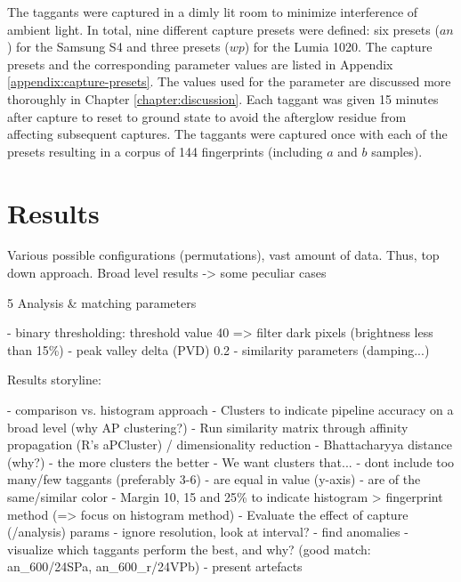 \documentclass[thesis.tex]{subfiles}
\begin{document}
The taggants were captured in a dimly lit room to minimize interference of ambient light. In total, nine different capture presets were defined: six presets ($an$) for the Samsung S4 and three presets ($wp$) for the Lumia 1020. The capture presets and the corresponding parameter values are listed in Appendix \ref{appendix:capture-presets}. The values used for the parameter are discussed more thoroughly in Chapter \ref{chapter:discussion}. Each taggant was given 15 minutes after capture to reset to ground state to avoid the afterglow residue from affecting subsequent captures. The taggants were captured once with each of the presets resulting in a corpus of 144 fingerprints (including $a$ and $b$ samples).

\section{Results}
\label{chapter:results}

Various possible configurations (permutations), vast amount of data. Thus, top down approach. Broad level results -> some peculiar cases


5 Analysis \& matching parameters

- binary thresholding: threshold value 40 => filter dark pixels (brightness less than 15\%)
- peak valley delta (PVD) 0.2
- similarity parameters (damping...)

Results storyline:

- comparison vs. histogram approach
- Clusters to indicate pipeline accuracy on a broad level (why AP clustering?)
  - Run similarity matrix through affinity propagation (R's aPCluster) / dimensionality reduction
  - Bhattacharyya distance (why?)
  - the more clusters the better
  - We want clusters that...
    - dont include too many/few taggants (preferably 3-6)
    - are equal in value (y-axis)
    - are of the same/similar color
- Margin 10, 15 and 25\% to indicate histogram > fingerprint method (=> focus on histogram method)
- Evaluate the effect of capture (/analysis) params
  - ignore resolution, look at interval?
  - find anomalies
  - visualize which taggants perform the best, and why? (good match: an\_600/24SPa, an\_600\_r/24VPb)
- present artefacts
\end{document}
